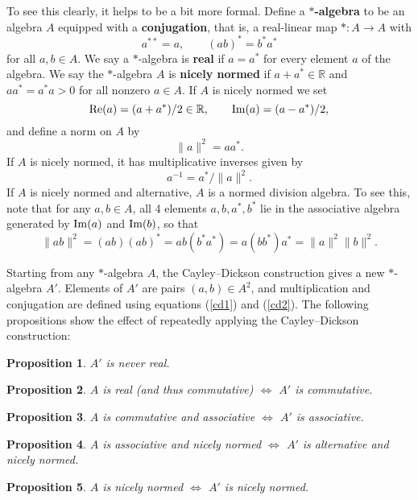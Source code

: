 \documentclass[12pt]{article}
\newcommand\R{{\mathbb R}}
\newcommand{\et}{\hspace{-0.08in}{\bf .}\hspace{0.1in}}
\renewcommand{\Re}{{\rm Re}}
\renewcommand{\Im}{{\rm Im}}
\newcommand{\maps}{\colon}
\newtheorem{prop}{Proposition}
\begin{document}
To see this clearly, it helps to be a bit more formal.  Define a {\bf   
$\ast$-algebra} to be an algebra $A$ equipped with a {\bf conjugation},   
that is, a real-linear map $\ast \maps A \to A$ with   
\[            a^{**} = a, \quad \quad (ab)^* = b^* a^*  \]   
for all $a,b \in A$.  We say a $\ast$-algebra is {\bf real} if  $a =   
a^*$ for every element $a$ of the algebra.  We say the $\ast$-algebra   
$A$ is {\bf nicely normed} if $a + a^* \in \R$ and $aa^* = a^* a > 0$ 
for all nonzero $a \in A$.  If $A$ is nicely normed we set   
\[             \Re(a) = (a + a^\ast)/2  \in \R, \qquad   
               \Im(a) = (a - a^\ast)/2 ,  \]   
and define a norm on $A$ by    
\[                 \|a\|^2 = aa^\ast .      \]   
If $A$ is nicely normed, it has multiplicative inverses given by   
\[               a^{-1} = a^\ast / \|a\|^2   .\]   
If $A$ is nicely normed and alternative, $A$ is a normed division   
algebra.  To see this, note that for any $a,b \in A$, all 4 elements   
$a,b,a^\ast,b^\ast$ lie in the associative algebra generated by $\Im(a)$   
and $\Im(b)$, so that    
\[     \|ab\|^2 = (ab)(ab)^\ast = ab(b^\ast a^\ast) =    
a(bb^\ast)a^\ast = \|a\|^2 \|b\|^2 . \]   
   
Starting from any $\ast$-algebra $A$, the Cayley--Dickson construction   
gives a new $\ast$-algebra $A'$.   Elements of $A'$ are pairs $(a,b) \in   
A^2$, and multiplication and conjugation are defined using equations   
(\ref{cd1}) and (\ref{cd2}).   The following propositions show the   
effect of repeatedly applying the Cayley--Dickson construction:   
   
\begin{prop} \et \label{CD1}   
$A'$ is never real.     
\end{prop}   
   
\begin{prop} \et \label{CD2}   
$A$ is real (and thus commutative) $\iff$ $A'$ is commutative.   
\end{prop}     
   
\begin{prop} \et \label{CD3}   
$A$ is commutative and associative $\iff$ $A'$ is associative.    
\end{prop}   
   
\begin{prop} \et \label{CD4}   
$A$ is associative and nicely normed $\iff$   
$A'$ is alternative and nicely normed.   
\end{prop}      
   
\begin{prop} \et\label{CD5}   
$A$ is nicely normed $\iff$ $A'$ is nicely normed.    
\end{prop}      
   
\end{document}

